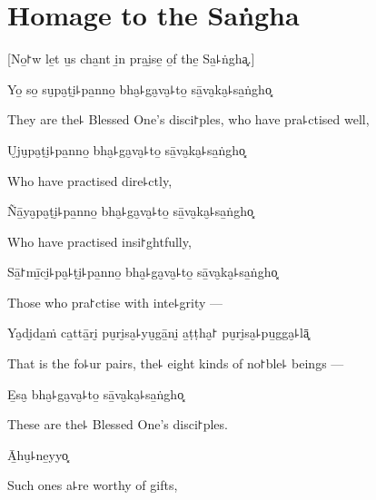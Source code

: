 \clearpage

\chapter{Homage to the Saṅgha}

\begin{leader}
\end{leader}

\begin{english}
  [No̱꜓w le̱t u̱s cha̱nt i̱n pra̱i̮se̱ o̱f the̱ Sa̱꜕ṅgha͓.]
\end{english}

Yo̱ so̱ su̮pa̮ṭi̮꜕pa̱nno̱ bha̮꜕ga̮va̮꜕to̱ sā̱va̮ka̮꜕sa̱ṅgho͓

\begin{english}
  They are the꜕ Blessed One's disci꜓ples, who have pra꜕ctised well,
\end{english}

U̮ju̮pa̮ṭi̮꜕pa̱nno̱ bha̮꜕ga̮va̮꜕to̱ sā̱va̮ka̮꜕sa̱ṅgho͓

\begin{english}
  Who have practised dire꜕ctly,
\end{english}

Ñā̱ya̮pa̮ṭi̮꜕pa̱nno̱ bha̮꜕ga̮va̮꜕to̱ sā̱va̮ka̮꜕sa̱ṅgho͓

\begin{english}
  Who have practised insi꜓ghtfully,
\end{english}

Sā̱꜓mī̱ci̮꜕pa̮꜕ṭi̮꜕pa̱nno̱ bha̮꜕ga̮va̮꜕to̱ sā̱va̮ka̮꜕sa̱ṅgho͓

\begin{english}
  Those who pra꜓ctise with inte꜕grity ---
\end{english}

Ya̮di̮da̱ṁ ca̱ttā̱ri̮ pu̮ri̮sa̮꜕yu̮gā̱ni̮ a̱ṭṭha̮꜓ pu̮ri̮sa̮꜕pu̱gga̮꜕lā͓

\begin{english}
  That is the fo꜕ur pairs, the꜕ eight kinds of no꜓ble꜕ beings ---
\end{english}

E̱sa̮ bha̮꜕ga̮va̮꜕to̱ sā̱va̮ka̮꜕sa̱ṅgho͓

\begin{english}
  These are the꜕ Blessed One's disci꜓ples.
\end{english}

Ā̱hu̮꜕ne̱yyo͓

\begin{english}
  Such ones a꜕re worthy of gifts,
\end{english}

